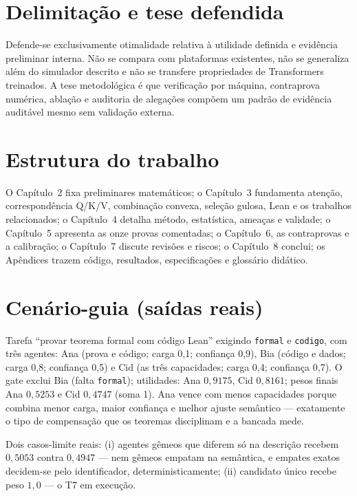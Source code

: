 \section{Delimitação e tese defendida}
Defende-se exclusivamente otimalidade relativa à utilidade definida e evidência preliminar interna. Não se compara com plataformas existentes, não se generaliza além do simulador descrito e não se transfere propriedades de Transformers treinados. A tese metodológica é que verificação por máquina, contraprova numérica, ablação e auditoria de alegações compõem um padrão de evidência auditável mesmo sem validação externa.
\section{Estrutura do trabalho}
O Capítulo~2 fixa preliminares matemáticos; o Capítulo~3 fundamenta atenção, correspondência Q/K/V, combinação convexa, seleção gulosa, Lean e os trabalhos relacionados; o Capítulo~4 detalha método, estatística, ameaças e validade; o Capítulo~5 apresenta as onze provas comentadas; o Capítulo~6, as contraprovas e a calibração; o Capítulo~7 discute revisões e riscos; o Capítulo~8 conclui; os Apêndices trazem código, resultados, especificações e glossário didático.
\section{Cenário-guia (saídas reais)}
Tarefa ``provar teorema formal com código Lean'' exigindo \texttt{formal} e \texttt{codigo}, com três agentes: Ana (prova e código; carga 0,1; confiança 0,9), Bia (código e dados; carga 0,8; confiança 0,5) e Cid (as três capacidades; carga 0,4; confiança 0,7). O gate exclui Bia (falta \texttt{formal}); utilidades: Ana $0{,}9175$, Cid $0{,}8161$; pesos finais Ana $0{,}5253$ e Cid $0{,}4747$ (soma 1). Ana vence com menos capacidades porque combina menor carga, maior confiança e melhor ajuste semântico --- exatamente o tipo de compensação que os teoremas disciplinam e a bancada mede.
\par Dois casos-limite reais: (i) agentes gêmeos que diferem só na descrição recebem $0{,}5053$ contra $0{,}4947$ --- nem gêmeos empatam na semântica, e empates exatos decidem-se pelo identificador, deterministicamente; (ii) candidato único recebe peso $1{,}0$ --- o T7 em execução.
